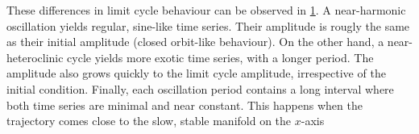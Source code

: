 \begin{figure}
\label{fig:lc_sims}
\end{figure}

These differences in limit cycle behaviour can be observed in \cref{fig:lc_sims}. A near-harmonic oscillation yields regular, sine-like time series. Their amplitude is rougly the same as their initial amplitude (closed orbit-like behaviour). On the other hand, a near-heteroclinic cycle yields more exotic time series, with a longer period. The amplitude also grows quickly to the limit cycle amplitude, irrespective of the initial condition. Finally, each oscillation period contains a long interval where both time series are minimal and near constant. This happens when the trajectory comes close to the slow, stable manifold on the $x$-axis
